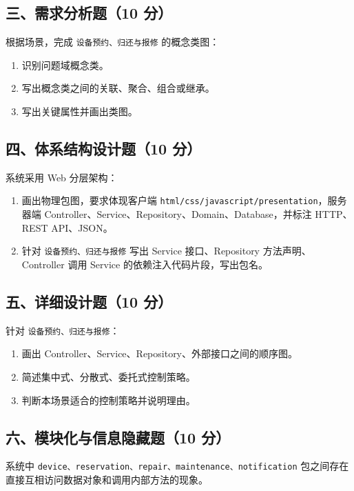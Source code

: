 \documentclass[UTF8,zihao=-4]{ctexart}
\begin{document}
\subsection{三、需求分析题（10 分）}


根据场景，完成 \texttt{设备预约、归还与报修} 的概念类图：


\begin{enumerate}
\item 识别问题域概念类。
\item 写出概念类之间的关联、聚合、组合或继承。
\item 写出关键属性并画出类图。
\end{enumerate}


\subsection{四、体系结构设计题（10 分）}


系统采用 Web 分层架构：


\begin{enumerate}
\item 画出物理包图，要求体现客户端 \texttt{html/css/javascript/presentation}，服务器端 Controller、Service、Repository、Domain、Database，并标注 HTTP、REST API、JSON。
\item 针对 \texttt{设备预约、归还与报修} 写出 Service 接口、Repository 方法声明、Controller 调用 Service 的依赖注入代码片段，写出包名。
\end{enumerate}


\subsection{五、详细设计题（10 分）}


针对 \texttt{设备预约、归还与报修}：


\begin{enumerate}
\item 画出 Controller、Service、Repository、外部接口之间的顺序图。
\item 简述集中式、分散式、委托式控制策略。
\item 判断本场景适合的控制策略并说明理由。
\end{enumerate}


\subsection{六、模块化与信息隐藏题（10 分）}


系统中 \texttt{device、reservation、repair、maintenance、notification} 包之间存在直接互相访问数据对象和调用内部方法的现象。
\end{document}
